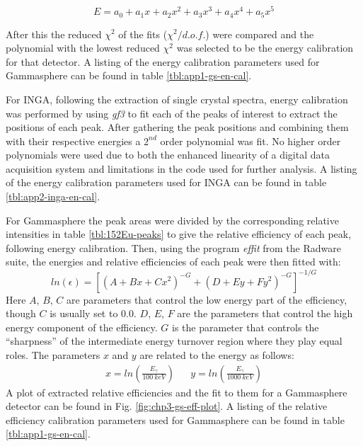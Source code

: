 \begin{equation}
\label{eqn:en_cal} 
E = a_0 + a_1x + a_2x^2 + a_3x^3 + a_4x^4 + a_5x^5
\end{equation}

After this the reduced $\chi{}^2$ of the fits ($\chi^2/d.o.f.$) were compared and the polynomial with the lowest reduced $\chi{}^2$ was selected to be the energy calibration for that detector. A listing of the energy calibration parameters used for Gammasphere can be found in table \ref{tbl:app1-gs-en-cal}.

For INGA, following the extraction of single crystal spectra, energy calibration was performed by using \emph{gf3} to fit each of the peaks of interest to extract the positions of each peak. After gathering the peak positions and combining them with their respective energies a $2^{nd}$ order polynomial was fit. No higher order polynomials were used due to both the enhanced linearity of a digital data acquisition system and limitations in the code used for further analysis. A listing of the energy calibration parameters used for INGA can be found in table \ref{tbl:app2-inga-en-cal}.

For Gammasphere the peak areas were divided by the corresponding relative intensities in table \ref{tbl:152Eu-peaks} to give the relative efficiency of each peak, following energy calibration. Then, using the program \emph{effit} from the Radware suite, the energies and relative efficiencies of each peak were then fitted with:
\begin{equation}
\label{eqn:eff_cal} 
ln(\epsilon) = [(A+Bx+Cx^2)^{-G} + (D+Ey+Fy^2)^{-G}]^{-1/G}
\end{equation}
Here $A$, $B$, $C$ are parameters that control the low energy part of the efficiency, though $C$ is usually set to $0.0$. $D$, $E$, $F$ are the parameters that control the high energy component of the efficiency. $G$ is the parameter that controls the ``sharpness'' of the intermediate energy turnover region where they play equal roles. The parameters $x$ and $y$ are related to the \gr{} energy as follows:
\begin{align*}
\label{eqn:eff_x_and_y}
x=ln(\frac{E_{\gamma{}}}{100~keV}) && y=ln(\frac{E_{\gamma{}}}{1000~keV})
\end{align*}
A plot of extracted relative efficiencies and the fit to them for a Gammasphere detector can be found in Fig. \ref{fig:chp3-gs-eff-plot}. A listing of the relative efficiency calibration parameters used for Gammasphere can be found in table \ref{tbl:app1-gs-en-cal}.


